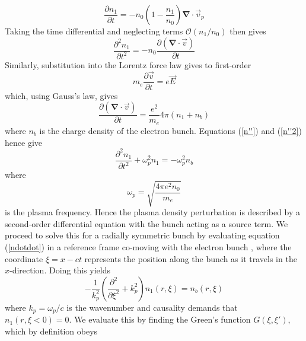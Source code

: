 \begin{equation}
\frac{\partial n_1}{\partial t}= -n_0\left( 1- \frac{n_1}{n_0}\right)\mathbf{\nabla}\cdot \vec{v}_p
\end{equation}
Taking the time differential and neglecting terms $\mathcal{O}(n_1/n_0)$ then gives
\begin{equation}
\frac{\partial^2 n_1}{\partial t^2}= -n_0\frac{\partial (\mathbf{\nabla}\cdot\vec{v})}{\partial t}
\label{n''}
\end{equation}
Similarly, substitution into the Lorentz force law gives to first-order
\begin{equation}
 m_e\frac{\partial \vec{v}}{\partial t}= e\vec{E}
 \label{lorentz_force_plasma}
\end{equation} %
which, using Gauss's law, gives
\begin{equation}
\frac{\partial (\mathbf{\nabla}\cdot\vec{v})}{\partial t}= \frac{e^2}{m_e}4\pi (n_1+n_b)
\label{n''2}
\end{equation}
where $n_b$ is the charge density of the electron bunch. Equations (\ref{n''}) and (\ref{n''2}) hence give
\begin{equation}
\frac{\partial^2 n_1}{\partial t^2}+\omega_p^2n_1=-\omega_p^2n_b
\label{ndotdot}
\end{equation}
where 
\begin{equation}
\omega_p=\sqrt{\frac{4\pi e^2n_0}{m_e} }
\label{plasma_frequency}
\end{equation}
is the plasma frequency. Hence the plasma density perturbation is described by a second-order differential equation with the bunch acting as a source term. We proceed to solve this for a radially symmetric bunch by evaluating equation (\ref{ndotdot}) in a reference frame co-moving with the electron bunch \cite{Dawson1959}, where the coordinate $\xi=x-ct$ represents the position along the bunch as it travels in the $x$-direction. Doing this yields
\begin{equation}
-\frac{1}{k_p^2}\left(\frac{\partial^2 }{\partial \xi^2}+k_p^2\right)n_1\left(r,\xi \right)=n_b\left(r,\xi \right) 
\end{equation}
where $k_p=\omega_p/c$ is the wavenumber and causality demands that $n_1\left(r,\xi<0 \right)=0$. We evaluate this by finding the Green's function $G\left(\xi,\xi'\right)$, which by definition obeys 

